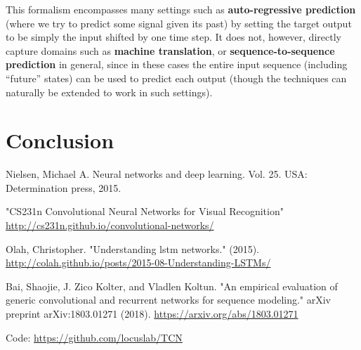 \documentclass[12pt, titlepage]{article}
\begin{document}
This formalism encompasses many settings such as \textbf{auto-regressive prediction} (where we try to predict some signal given its past) by setting the target output to be simply the input shifted by one time step. It does not, however, directly capture domains such as \textbf{machine translation}, or \textbf{sequence-to-sequence prediction} in general, since in these cases the entire input sequence (including “future” states) can be used to predict each output (though the techniques can naturally be extended to work in such settings).

\section{Conclusion}





\begin{thebibliography}{0}
   Nielsen, Michael A. Neural networks and deep learning. Vol. 25. USA: Determination press, 2015.
  
   "CS231n Convolutional Neural Networks for Visual Recognition" \url{http://cs231n.github.io/convolutional-networks/}
  
   Olah, Christopher. "Understanding lstm networks." (2015). \url{http://colah.github.io/posts/2015-08-Understanding-LSTMs/}
  
   Bai, Shaojie, J. Zico Kolter, and Vladlen Koltun. "An empirical evaluation of generic convolutional and recurrent networks for sequence modeling." arXiv preprint arXiv:1803.01271 (2018). \url{https://arxiv.org/abs/1803.01271} 
  
  Code: \url{https://github.com/locuslab/TCN}
  
  


  
  
  
  
  \end{thebibliography}


 
\end{document}
